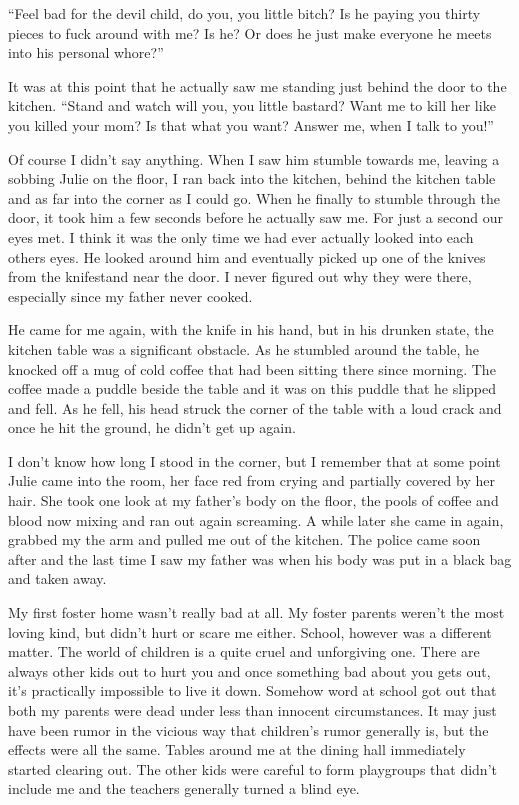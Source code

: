 \documentclass[11pt,letterpaper]{article}
\begin{document}
``Feel bad for the devil child, do you, you little bitch? Is he paying you thirty pieces to fuck around with me? Is he? Or does he just make everyone he meets into his personal whore?''

It was at this point that he actually saw me standing just behind the door to the kitchen. ``Stand and watch will you, you little bastard? Want me to kill her like you killed your mom? Is that what you want? Answer me, when I talk to you!''

Of course I didn't say anything. When I saw him stumble towards me, leaving a sobbing Julie on the floor, I ran back into the kitchen, behind the kitchen table and as far into the corner as I could go. When he finally to stumble through the door, it took him a few seconds before he actually saw me. For just a second our eyes met. I think it was the only time we had ever actually looked into each others eyes. He looked around him and eventually picked up one of the knives from the knifestand near the door. I never figured out why they were there, especially since my father never cooked.

He came for me again, with the knife in his hand, but in his drunken state, the kitchen table was a significant obstacle. As he stumbled around the table, he knocked off a mug of cold coffee that had been sitting there since morning. The coffee made a puddle beside the table and it was on this puddle that he slipped and fell. As he fell, his head struck the corner of the table with a loud crack and once he hit the ground, he didn't get up again.

I don't know how long I stood in the corner, but I remember that at some point Julie came into the room, her face red from crying and partially covered by her hair. She took one look at my father's body on the floor, the pools of coffee and blood now mixing and ran out again screaming. A while later she came in again, grabbed my the arm and pulled me out of the kitchen. The police came soon after and the last time I saw my father was when his body was put in a black bag and taken away.

My first foster home wasn't really bad at all. My foster parents weren't the most loving kind, but didn't hurt or scare me either. School, however was a different matter. The world of children is a quite cruel and unforgiving one. There are always other kids out to hurt you and once something bad about you gets out, it's practically impossible to live it down. Somehow word at school got out that both my parents were dead under less than innocent circumstances. It may just have been rumor in the vicious way that children's rumor generally is, but the effects were all the same. Tables around me at the dining hall immediately started clearing out. The other kids were careful to form playgroups that didn't include me and the teachers generally turned a blind eye.
\end{document}
